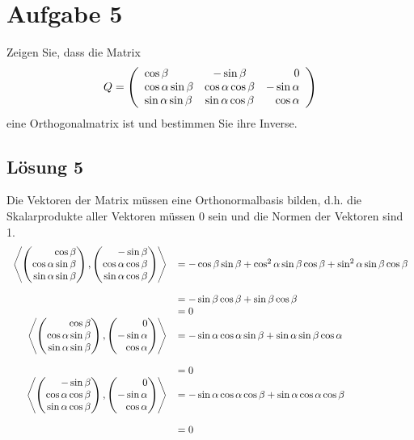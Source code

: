 \documentclass[main.tex]{subfiles}
\begin{document}
\section{Aufgabe 5}
Zeigen Sie, dass die Matrix
\[
	Q = \eqmatrix{lcr}{
		\cos\beta            & -\sin\beta           & 0 \\
		\cos\alpha \sin\beta & \cos\alpha \cos\beta & -\sin\alpha \\
		\sin\alpha \sin\beta & \sin\alpha \cos\beta & \cos\alpha \\
	}
\]
eine Orthogonalmatrix ist und bestimmen Sie ihre Inverse.

\subsection{Lösung 5}
Die Vektoren der Matrix müssen eine Orthonormalbasis bilden, d.h. die Skalarprodukte aller Vektoren müssen 0 sein und die Normen der Vektoren sind 1.
\begin{align*}
	\begin{array}{rl}
		\scalarprod*{
            \vektor{\cos\beta\\\cos\alpha\sin\beta\\\sin\alpha \sin\beta},
            \vektor{-\sin\beta\\\cos\alpha \cos\beta\\\sin\alpha \cos\beta}
        }
		& = -\cos\beta\sin\beta + \cos^2\alpha\sin\beta\cos\beta + \sin^2\alpha\sin\beta\cos\beta\\[8mm]
		& = -\sin\beta\cos\beta + \sin\beta\cos\beta\\
		& = 0\\
		\scalarprod*{
            \vektor{\cos\beta\\\cos\alpha\sin\beta\\\sin\alpha \sin\beta},
            \vektor{0\\-\sin\alpha\\\cos\alpha}
        }
		& = -\sin\alpha\cos\alpha\sin\beta + \sin\alpha \sin\beta\cos\alpha\\[8mm]
		& = 0\\
		\scalarprod*{
            \vektor{-\sin\beta\\\cos\alpha \cos\beta\\\sin\alpha \cos\beta},
            \vektor{0\\-\sin\alpha\\\cos\alpha}
        }
		& = -\sin\alpha\cos\alpha\cos\beta + \sin\alpha\cos\alpha\cos\beta\\[8mm]
		& = 0
	\end{array}
\end{align*}
\end{document}

